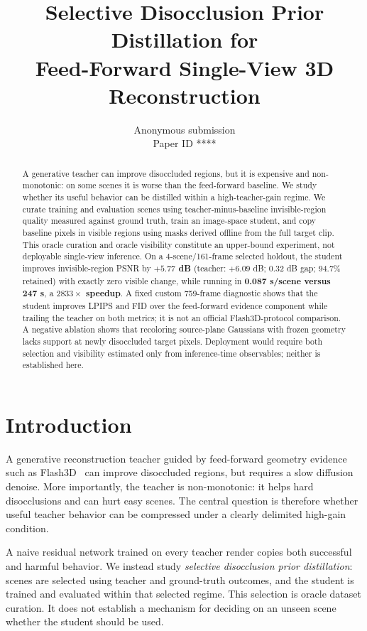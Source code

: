 \documentclass[10pt,twocolumn,letterpaper]{article}
\title{Selective Disocclusion Prior Distillation for\\ Feed-Forward Single-View 3D Reconstruction}
\author{Anonymous submission\\\small Paper ID ****}
\date{}
\begin{document}
\maketitle

\begin{abstract}
A generative teacher can improve disoccluded regions, but it is expensive and
non-monotonic: on some scenes it is worse than the feed-forward baseline. We
study whether its useful behavior can be distilled within a high-teacher-gain
regime. We curate training and evaluation scenes using teacher-minus-baseline
invisible-region quality measured against ground truth, train an image-space
student, and copy baseline pixels in visible regions using masks derived offline
from the full target clip. This oracle curation and oracle visibility constitute
an upper-bound experiment, not deployable single-view inference. On a
4-scene/161-frame selected holdout, the student improves invisible-region PSNR
by \textbf{$+5.77$ dB} (teacher: $+6.09$ dB; 0.32 dB gap; 94.7\% retained)
with exactly zero visible change, while running in \textbf{0.087 s/scene versus
247 s}, a \textbf{$2833\times$ speedup}. A fixed custom 759-frame diagnostic
shows that the student improves LPIPS and FID over the feed-forward evidence
component while trailing the teacher on both metrics; it is not an official
Flash3D-protocol comparison. A negative ablation shows that recoloring
source-plane Gaussians with frozen geometry lacks support at newly disoccluded
target pixels. Deployment would require both selection and visibility estimated
only from inference-time observables; neither is established here.
\end{abstract}

\section{Introduction}
\label{sec:intro}
A generative reconstruction teacher guided by feed-forward geometry evidence
such as Flash3D~\cite{flash3d} can improve disoccluded regions, but requires a
slow diffusion denoise. More importantly, the teacher is non-monotonic: it helps
hard disocclusions and can hurt easy scenes. The central question is therefore
whether useful teacher behavior can be compressed under a clearly delimited
high-gain condition.

A naive residual network trained on every teacher render copies both successful
and harmful behavior. We instead study \emph{selective disocclusion prior
distillation}: scenes are selected using teacher and ground-truth outcomes, and
the student is trained and evaluated within that selected regime. This selection
is oracle dataset curation. It does not establish a mechanism for deciding on an
unseen scene whether the student should be used.
\end{document}
